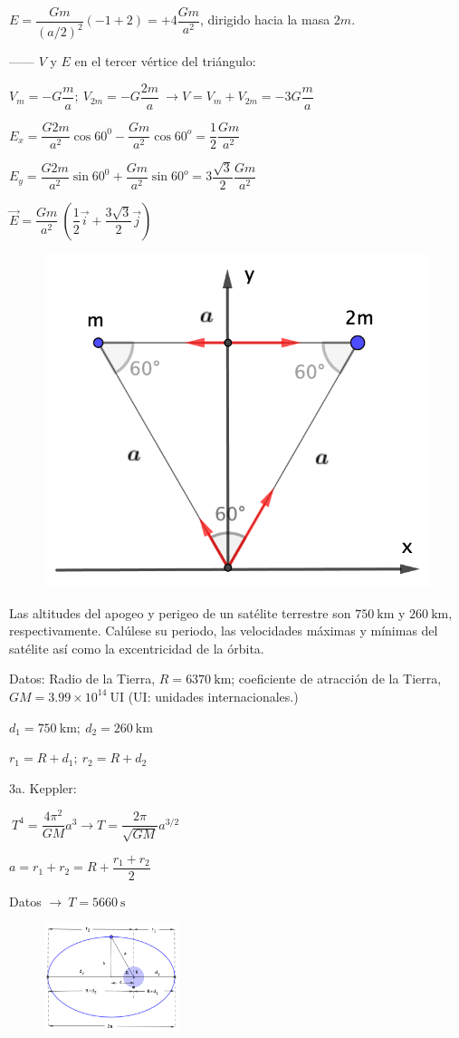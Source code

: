 $E=\dfrac{Gm}{(a/2)^2}(-1+2)=+4\dfrac{Gm}{a^2}$, dirigido hacia la masa $2m$.
\begin{multicols}{2}
------ $V$ y $E$ en el tercer vértice del triángulo:

$V_m=-G\dfrac m a ;\ V_{2m}=-G \dfrac {2m} a \ \to V=V_m+V_{2m}=-3G\dfrac m a$

$E_x=\dfrac{G2m}{a^2} \cos 60^0 - \dfrac{Gm}{a^2} \cos 60^o = \dfrac 1 2 \dfrac{Gm}{a^2}$

$E_y=\dfrac{G2m}{a^2} \sin 60^0 + \dfrac{Gm}{a^2} \sin 60^o = 3 \dfrac{\sqrt{3}}2 \dfrac{Gm}{a^2}$

$\vec E=\dfrac{Gm}{a^2}\ \left( \dfrac 1 2 \vec i + \dfrac{3\sqrt{3}}2 \vec j \right)$
\begin{figure}[H]
	\centering
	\includegraphics[width=.4\textwidth]{imagenes/imagenes15/T15IM06.png}
\end{figure}	
\end{multicols}

\vspace{15mm} %
\begin{prob}
	Las altitudes del apogeo y perigeo de un satélite terrestre son $750\ \mathrm{km}$ y $260\ \mathrm{km}$, respectivamente. Calúlese su periodo, las velocidades máximas y mínimas del satélite así como la excentricidad de la órbita.
	
	Datos: Radio de la Tierra, $R=6370\ \mathrm{km}$; coeficiente de atracción de la Tierra, $GM=3.99\times 10^{14}\ \mathrm{UI}$ (\textcolor{gris}{UI: unidades internacionales.})
\end{prob}
 

 \begin{multicols}{2}
 $d_1=750\ \mathrm{km}; \ d_2=260\ \mathrm{km}$
 
 $r_1=R+d_1;\ r_2=R+d_2$
 
 
 3a. Keppler: 
 
 $\ T^4=\dfrac{4\pi^2}{GM}a^3 \to T=\dfrac{2\pi}{\sqrt{GM}}a^{3/2}$
 
 $a=r_1+r_2 =R+\dfrac{r_1+r_2}2$
 
 Datos $\to \ T=5660\ \mathrm{s}$
 	\begin{figure}[H]
	\centering
	\includegraphics[width=0.35\textwidth]{imagenes/imagenes15/T15IM07.png}
\end{figure}
 \end{multicols}

